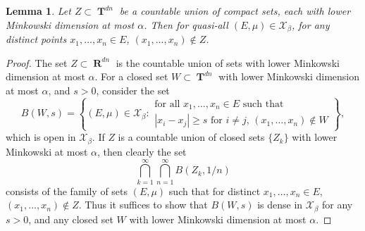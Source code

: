 \documentclass[dvipsnames,letterpaper,12pt]{article}
\numberwithin{equation}{section}
\DeclareMathOperator{\RR}{\mathbf{R}}
\DeclareMathOperator{\TT}{\mathbf{T}}
\newtheorem{lemma}[theorem]{Lemma}
\numberwithin{theorem}{section}
\begin{document}
\begin{lemma} \label{LemmaVIVIJCIJSIJ}
    Let $Z \subset \TT^{dn}$ be a countable union of compact sets, each with lower Minkowski dimension at most $\alpha$. Then for quasi-all $(E,\mu) \in \mathcal{X}_\beta$, for any distinct points $x_1, \dots, x_n \in E$, $(x_1, \dots, x_n) \not \in Z$.
\end{lemma}
\begin{proof}
    The set $Z \subset \RR^{dn}$ is the countable union of sets with lower Minkowski dimension at most $\alpha$. For a closed set $W \subset \TT^{dn}$ with lower Minkowski dimension at most $\alpha$, and $s > 0$, consider the set
    \[ B(W,s) = \left\{ (E,\mu) \in \mathcal{X}_\beta: \begin{array}{c}
            \text{for all $x_1, \dots, x_n \in E$ such that}\\
            \text{$|x_i - x_j| \geq s$ for $i \neq j$, $(x_1, \dots, x_n) \not \in W$}
        \end{array} \right\}, \]
    which is open in $\mathcal{X}_\beta$.
    If $Z$ is a countable union of closed sets $\{ Z_k \}$ with lower Minkowski at most $\alpha$, then clearly the set
    \[ \bigcap_{k = 1}^\infty \bigcap_{n = 1}^\infty B(Z_k,1/n) \]
    consists of the family of sets $(E,\mu)$ such that for distinct $x_1, \dots, x_n \in E$, $(x_1, \dots, x_n) \not \in Z$. Thus it suffices to show that $B(W,s)$ is dense in $\mathcal{X}_\beta$ for any $s > 0$, and any closed set $W$ with lower Minkowski dimension at most $\alpha$.


\end{proof}
\end{document}
